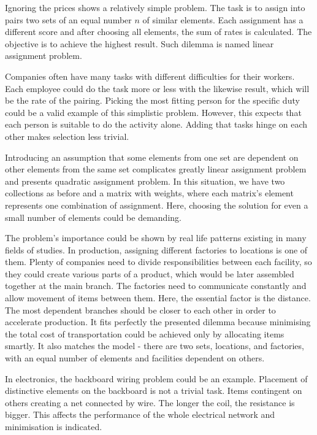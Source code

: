 \documentclass[english,a4paper,twoside]{ppfcmthesis}
\begin{document}
Ignoring the prices shows a relatively simple problem.
The task is to assign into pairs two sets of an equal number $n$ of similar elements.
Each assignment has a different score and after choosing all elements, the sum of rates is calculated.
The objective is to achieve the highest result.
Such dilemma is named linear assignment problem.

Companies often have many tasks with different difficulties for their workers.
Each employee could do the task more or less with the likewise result, which will be the rate of the pairing.
Picking the most fitting person for the specific duty could be a valid example of this simplistic problem.
However, this expects that each person is suitable to do the activity alone.
Adding that tasks hinge on each other makes selection less trivial.

Introducing an assumption that some elements from one set are dependent on other elements from the same set complicates greatly linear assignment problem and presents quadratic assignment problem.
In this situation, we have two collections as before and a matrix with weights, where each matrix's element represents one combination of assignment.
Here, choosing the solution for even a small number of elements could be demanding.

The problem's importance could be shown by real life patterns existing in many fields of studies.
In production, assigning different factories to locations is one of them.
Plenty of companies need to divide responsibilities between each facility, so they could create various parts of a product, which would be later assembled together at the main branch.
The factories need to communicate constantly and allow movement of items between them.
Here, the essential factor is the distance.
The most dependent branches should be closer to each other in order to accelerate production.
It fits perfectly the presented dilemma because minimising the total cost of transportation could be achieved only by allocating items smartly.
It also matches the model - there are two sets, locations, and factories, with an equal number of elements and facilities dependent on others.

In electronics, the backboard wiring problem could be an example.
Placement of distinctive elements on the backboard is not a trivial task.
Items contingent on others creating a net connected by wire.
The longer the coil, the resistance is bigger.
This affects the performance of the whole electrical network and minimisation is indicated.
\end{document}
